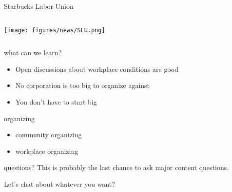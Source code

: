 \documentclass[aspectratio=43,17pt]{beamer} %
\begin{document}
\begin{frame}{Starbucks Labor Union}
  
\begin{columns}
\begin{column}{0.7\textwidth}
\texttt{[image: figures/news/SLU.png]}
\end{column}
\end{columns}
\end{frame}


\begin{frame}{what can we learn?}
    
\begin{itemize}
  \item<+-> Open discussions about workplace conditions are good
  \item<+-> No corporation is too big to organize against
  \item<+-> You don't have to start big
\end{itemize}

\end{frame}



\begin{frame}{organizing}
    
\begin{itemize}
  \item community organizing
  \item workplace organizing
\end{itemize}

\end{frame}



\begin{frame}{questions?}
    This is probably the last chance to ask major content questions.

    Let's chat about whatever you want?

\end{frame}
\end{document}

